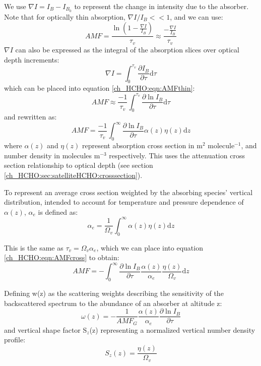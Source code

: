     We use $\nabla I = I_B - I_{B_0}$ to represent the change in intensity due to the absorber. Note that for optically thin absorption, $\nabla I / I_B << 1$, and we can use:
    \begin{equation} \label{ch_HCHO:eqn:AMFthin}
      AMF = \frac{\ln{ \left( 1 - \frac{\nabla I}{I_B} \right)} }{\tau_v} \approx \frac{ - \frac{\nabla I}{I_B} }{\tau_v}
    \end{equation}
    $\nabla I$ can also be expressed as the integral of the absorption slices over optical depth increments: 
    \begin{equation*}
      \nabla I = \int_0^{\tau_v}{\frac{\partial I_B}{\partial \tau} \mathrm{d}\tau}
    \end{equation*}
    which can be placed into equation \ref{ch_HCHO:eqn:AMFthin}:
    \begin{equation*}
      AMF \approx \frac{-1}{\tau_v} \int_0^{\tau_v}{\frac{\partial \ln{I_B}}{\partial \tau} \mathrm{d}\tau}
    \end{equation*}
    and rewritten as:
    \begin{equation} \label{ch_HCHO:eqn:AMFcross}
      AMF = \frac{-1}{\tau_v} \int_0^\infty {\frac{\partial \ln{I_B}}{\partial \tau} \alpha(z)\eta(z)\mathrm{d}z}
    \end{equation}
    where $\alpha(z)$ and $\eta(z)$ represent absorption cross section in m$^2$ molecule$^{-1}$, and number density in molecules m$^{-3}$ respectively. This uses the attenuation cross section relationship to optical depth (see section \ref{ch_HCHO:sec:satelliteHCHO:crosssection}).

    To represent an average cross section weighted by the absorbing species' vertical distribution, intended to account for temperature and pressure dependence of $\alpha(z)$, $\alpha_e$ is defined as:
    \begin{equation*}
      \alpha_e = \frac{1}{\Omega_v} \int_0^\infty \alpha(z) \eta(z) \mathrm{d}z
    \end{equation*}

    This is the same as $ \tau_v = \Omega_v \alpha_e $, which we can place into equation \ref{ch_HCHO:eqn:AMFcross} to obtain:
    \begin{equation*}
      AMF=-\int_0^\infty{ \frac{\partial \ln{I_B}}{\partial \tau} \frac{\alpha(z)}{\alpha_e} \frac{\eta(z)}{\Omega_v} \mathrm{d}z }
    \end{equation*}

    Defining w(z) as the scattering weights describing the sensitivity of the backscattered spectrum to the abundance of an absorber at altitude z:
    \begin{equation}
      \omega(z) = -\frac{1}{AMF_G} \frac{\alpha(z)}{\alpha_e} \frac{\partial \ln{I_B}}{\partial \tau}
    \end{equation}
    and vertical shape factor S$_z$(z) representing a normalized vertical number density profile: 
    \begin{equation} \label{ch_HCHO:eqn:ShapeFactor}
      S_z(z) = \frac{\eta(z)}{\Omega_v}
    \end{equation}
    
